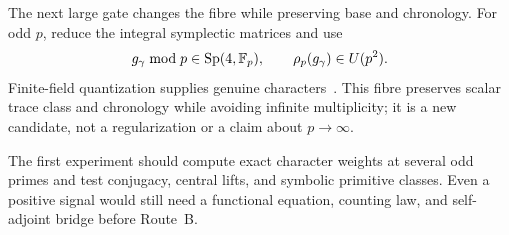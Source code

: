 The next large gate changes the fibre while preserving base and chronology.
For odd \(p\), reduce the integral symplectic matrices and use
\begin{equation}
 g_\gamma\bmod p\in\operatorname{Sp}(4,\mathbb{F}_p),
 \qquad
 \rho_p(g_\gamma)\in U(p^2).
 \label{eq:finite-weil-pivot}
\end{equation}
Finite-field quantization supplies genuine characters~\citep{gurevich2009}.
This fibre preserves scalar trace class and chronology while avoiding
infinite multiplicity; it is a new candidate, not a regularization or a
claim about \(p\to\infty\).

The first experiment should compute exact character weights at several odd
primes and test conjugacy, central lifts, and symbolic primitive classes.
Even a positive signal would still need a functional equation, counting law,
and self-adjoint bridge before Route~B.
